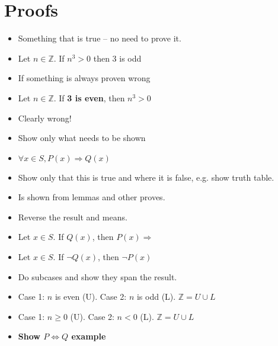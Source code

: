 \documentclass[english,10pt,a4paper]{article}
\begin{document}
\newpage
\section{Proofs}


\begin{theo} 
\begin{itemize}
\item Something that is true -- no need to prove it.
\item Let $n \in \mathbb{Z}$. If $n^3 > 0$ then 3 is odd
\end{itemize}
\end{theo}



\begin{theo} 
\begin{itemize}
\item If something is always proven wrong
\item Let $n \in \mathbb{Z}$. If \textbf{3 is even}, then $n^3 > 0$
\item[] Clearly wrong!
\end{itemize}
\end{theo}



\begin{theo} 
\begin{itemize}
\item Show only what needs to be shown
\item $\forall x \in S, P(x) \Rightarrow Q(x)$
\item[] Show only that this is true and where it is false, e.g. show truth table.
\item Is shown from lemmas and other proves.
\end{itemize}
\end{theo}



\begin{theo} 
\begin{itemize}
\item Reverse the result and means.
\item Let $x \in S$. If $Q(x)$, then $P(x) \Rightarrow$
\item[] Let $x \in S$. If $\neg Q(x)$, then $\neg P(x)$
\end{itemize}
\end{theo}



\begin{theo} 
\begin{itemize}
\item Do subcases and show they span the result.
\item Case 1: $n$ is even (U). Case 2: $n$ is odd (L). $\mathbb{Z} = U \cup L $
\item Case 1: $n\geq0$ (U). Case 2: $n<0$ (L). $\mathbb{Z} = U \cup L$
\item \textbf{Show $P \Leftrightarrow Q$ example}
\end{itemize}
\end{theo}
\end{document}
